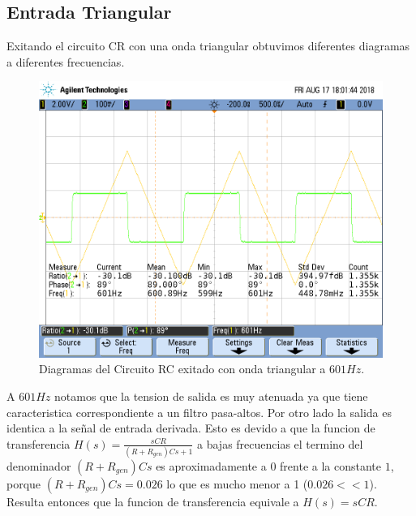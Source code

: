 \subsection{Entrada Triangular}

Exitando el circuito CR con una onda triangular obtuvimos diferentes diagramas a diferentes frecuencias.

\begin{figure}[h!]
\centering
\includegraphics[scale=0.3]{2_601.png}
\caption{Diagramas del Circuito RC exitado con onda triangular a $601Hz$.}
\label{fig:CR}
\end{figure}

A $601Hz$ notamos que la tension de salida es muy atenuada ya que tiene caracteristica correspondiente a un filtro pasa-altos. Por otro lado la salida es identica a la señal de entrada derivada. Esto es devido a que la funcion de transferencia  $H(s) = \frac{sCR}{\left(R+R_{gen}\right)Cs+1}$ a bajas frecuencias el termino del denominador $\left(R+R_{gen}\right)Cs$ es aproximadamente a $0$ frente a la constante $1$, porque $\left(R+R_{gen}\right)Cs = 0.026$ lo que es mucho menor a 1 ($0.026 << 1$). Resulta entonces que la funcion de transferencia equivale a $H(s) = sCR $.

